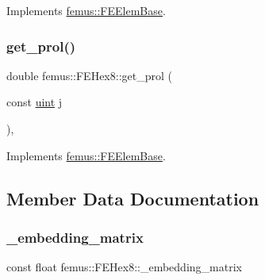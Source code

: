 Implements \mbox{\hyperlink{classfemus_1_1_f_e_elem_base_a0c4d6d5ec66bd4e301eb8ea2ef10f354}{femus\+::\+F\+E\+Elem\+Base}}.

\mbox{\label{classfemus_1_1_f_e_hex8_aa84066edfa5cac347255b6e8f2098cf5}} 
\subsubsection{\texorpdfstring{get\+\_\+prol()}{get\_prol()}}
{\footnotesize\ttfamily double femus\+::\+F\+E\+Hex8\+::get\+\_\+prol (\begin{DoxyParamCaption}\item[{const \mbox{\hyperlink{_typedefs_8hpp_a91ad9478d81a7aaf2593e8d9c3d06a14}{uint}}}]{j }\end{DoxyParamCaption})\hspace{0.3cm}{\ttfamily [inline]}, {\ttfamily [virtual]}}



Implements \mbox{\hyperlink{classfemus_1_1_f_e_elem_base_ac82326cdc7cb02329c7be9547d56fad4}{femus\+::\+F\+E\+Elem\+Base}}.



\subsection{Member Data Documentation}
\mbox{\label{classfemus_1_1_f_e_hex8_aea2ef04528935355545d3ebe2b2bf051}} 
\subsubsection{\texorpdfstring{\+\_\+embedding\+\_\+matrix}{\_embedding\_matrix}}
{\footnotesize\ttfamily const float femus\+::\+F\+E\+Hex8\+::\+\_\+embedding\+\_\+matrix\hspace{0.3cm}{\ttfamily [static]}}

\mbox{\label{classfemus_1_1_f_e_hex8_a282ec3050c8490f8195b908895148c58}} 
